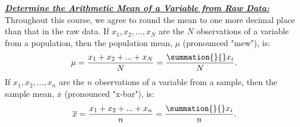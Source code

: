 \documentclass{report}
\begin{document}
        \bigbreak \noindent \bigbreak \noindent 
        \textbf{\textit{\underline{Determine the Arithmetic Mean of a Variable from Raw Data:}}}
        \bigbreak \noindent 
        Throughout this course, we agree to round the mean to one more decimal place than that in the raw data.
        \bigbreak \noindent 
        If $x_{1}, x_{2},...,x_{N}$ are the $N$  observations of a variable from a population, then the population mean, $\mu$  (pronounced "mew"), is:
        \begin{align*}
            \mu = \frac{x_{1} + x_{2} + ... + x_{N}}{N} = \frac{\summation{}{}x_{i}}{N}
        .\end{align*}
        \bigbreak \noindent 
        If $x_{1}, x_{2},...,x_{n}$ are the $n$  observations of a variable from a sample, then the sample mean, $\overline{x}$  (pronounced "x-bar"), is:
        \begin{align*}
            \overline{x} = \frac{x_{1} + x_{2} + ...+ x_{n}}{n} = \frac{\summation{}{}x_{i} }{n}
        .\end{align*}
        \bigbreak \noindent 
\end{document}
